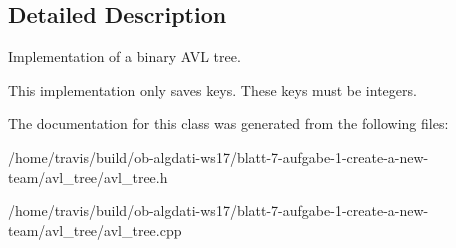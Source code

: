\subsection{Detailed Description}
Implementation of a binary A\-V\-L tree. 

This implementation only saves keys. These keys must be integers. 

The documentation for this class was generated from the following files\-:\begin{DoxyCompactItemize}
\item 
/home/travis/build/ob-\/algdati-\/ws17/blatt-\/7-\/aufgabe-\/1-\/create-\/a-\/new-\/team/avl\-\_\-tree/avl\-\_\-tree.\-h\item 
/home/travis/build/ob-\/algdati-\/ws17/blatt-\/7-\/aufgabe-\/1-\/create-\/a-\/new-\/team/avl\-\_\-tree/avl\-\_\-tree.\-cpp\end{DoxyCompactItemize}
